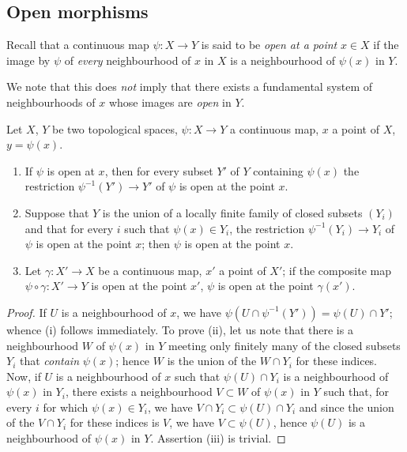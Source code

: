 \subsection{Open morphisms}
\label{subsection:IV.14.1}

\begin{env}[14.1.1]
\label{IV.14.1.1}
Recall  that a continuous map $\psi:X\to Y$ is said to be \emph{open at a point} $x\in X$ if the image by $\psi$ of \emph{every} neighbourhood of $x$ in $X$ is a neighbourhood of $\psi(x)$ in $Y$.

We note that this does \emph{not} imply that there exists a fundamental system of neighbourhoods of $x$ whose images are \emph{open} in $Y$.
\end{env}

\begin{proposition}[14.1.2]
\label{IV.14.1.2}
Let $X$, $Y$ be two topological spaces, $\psi:X\to Y$ a continuous map, $x$ a point of $X$, $y=\psi(x)$.
\begin{enumerate}[label=(\roman*)]
  \item If $\psi$ is open at $x$, then for every subset $Y'$ of $Y$ containing $\psi(x)$ the restriction $\psi^{-1}(Y')\to Y'$ of $\psi$ is open at the point $x$.
  \item Suppose that $Y$ is the union of a locally finite family of closed subsets $(Y_i)$ and that for every $i$ such that $\psi(x)\in Y_i$, the restriction $\psi^{-1}(Y_i)\to Y_i$ of $\psi$ is open at the point $x$; then $\psi$ is open at the point $x$.
  \item Let $\gamma:X'\to X$ be a continuous map, $x'$ a point of $X'$; if the composite map $\psi\circ\gamma:X'\to Y$ is open at the point $x'$, $\psi$ is open at the point $\gamma(x')$.
\end{enumerate}
\end{proposition}

\begin{proof}
If $U$ is a neighbourhood of $x$, we have $\psi(U\cap\psi^{-1}(Y'))=\psi(U)\cap Y'$; whence (i) follows immediately.
To prove (ii), let us note that there is a neighbourhood $W$ of $\psi(x)$ in $Y$ meeting only finitely many of the closed subsets $Y_i$ that \emph{contain} $\psi(x)$; hence $W$ is the union of the $W\cap Y_i$ for these indices.
Now, if $U$ is a neighbourhood of $x$ such that $\psi(U)\cap Y_i$ is a neighbourhood of $\psi(x)$ in $Y_i$, there exists a neighbourhood $V\subset W$ of $\psi(x)$ in $Y$ such that, for every $i$ for which $\psi(x)\in Y_i$,
we have $V\cap Y_i\subset\psi(U)\cap Y_i$ and since the union of the $V\cap Y_i$ for these indices is $V$, we have $V\subset\psi(U)$, hence $\psi(U)$ is a neighbourhood of $\psi(x)$ in $Y$.
Assertion (iii) is trivial.
\end{proof}

